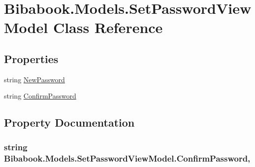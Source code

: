 \hypertarget{class_bibabook_1_1_models_1_1_set_password_view_model}{}\section{Bibabook.\+Models.\+Set\+Password\+View\+Model Class Reference}
\label{class_bibabook_1_1_models_1_1_set_password_view_model}
\subsection*{Properties}
\begin{DoxyCompactItemize}
\item 
string \hyperlink{class_bibabook_1_1_models_1_1_set_password_view_model_a03aa7070ad418f1a3ca64ebbbf57f258}{New\+Password}
\item 
string \hyperlink{class_bibabook_1_1_models_1_1_set_password_view_model_a78fb2bfcaff92db87cb3db1d9332e3fd}{Confirm\+Password}
\end{DoxyCompactItemize}


\subsection{Property Documentation}
\hypertarget{class_bibabook_1_1_models_1_1_set_password_view_model_a78fb2bfcaff92db87cb3db1d9332e3fd}{}
\subsubsection[{Confirm\+Password}]{\setlength{\rightskip}{0pt plus 5cm}string Bibabook.\+Models.\+Set\+Password\+View\+Model.\+Confirm\+Password\hspace{0.3cm}{\ttfamily [get]}, {\ttfamily [set]}}\label{class_bibabook_1_1_models_1_1_set_password_view_model_a78fb2bfcaff92db87cb3db1d9332e3fd}
\hypertarget{class_bibabook_1_1_models_1_1_set_password_view_model_a03aa7070ad418f1a3ca64ebbbf57f258}{}
